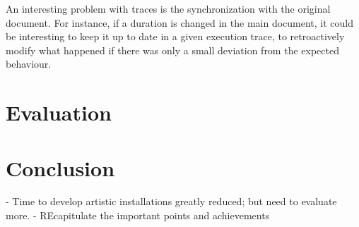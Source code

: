 \documentclass{sigchi}
\begin{document}
An interesting problem with traces is the synchronization with the original document. For instance, if a duration is changed in the main document, it could be interesting to keep it up to date in a given execution trace, to retroactively modify what happened if there was only a small deviation from the expected behaviour.


\section{Evaluation}
\section{Conclusion}
- Time to develop artistic installations greatly reduced; but need to evaluate more.
- REcapitulate the important points and achievements



\end{document}
